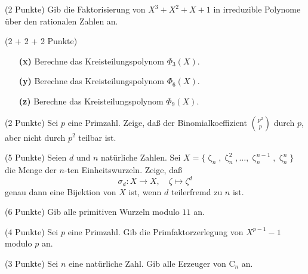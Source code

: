 \documentclass{algsheet}
\begin{document}
\begin{exercise}(2 Punkte)\newline
    Gib die Faktorisierung von \(X^3 + X^2 + X + 1\) in irreduzible Polynome über den rationalen Zahlen an.
\end{exercise}



\begin{exercise}(2 + 2 + 2 Punkte)
        \begin{itemize}
    \item[\textbf{(x)}]    
                   Berechne das Kreisteilungspolynom \(\Phi_3(X)\).
     \item[\textbf{(y)}] 
                  Berechne das Kreisteilungspolynom \(\Phi_6(X)\).
     \item[\textbf{(z)}]
                   Berechne das Kreisteilungspolynom \(\Phi_9(X)\).
        \end{itemize} 
\end{exercise}







\begin{exercise}(2 Punkte)\newline
    Sei \(p\) eine Primzahl. Zeige, daß der Binomialkoeffizient \(\binom{p^2} p\) durch \(p\), aber nicht
    durch \(p^2\) teilbar ist.
\end{exercise}



\begin{exercise}(5 Punkte)\newline
    Seien \(d\) und \(n\) natürliche Zahlen. Sei \(X = \{\upzeta_n, \upzeta_n^2, \dotsc, 
          \upzeta_n^{n - 1},
    \upzeta_n^n\}\) die Menge der \(n\)-ten Einheitswurzeln. Zeige, daß
    \[
        \sigma_d\colon X \to X,\quad \zeta \mapsto \zeta^d
    \]
    genau dann eine Bijektion von \(X\) ist, wenn \(d\) teilerfremd zu \(n\) ist.
\end{exercise}

\begin{exercise}(6 Punkte)\newline
    Gib alle primitiven Wurzeln modulo \(11\) an.
\end{exercise}

\begin{exercise}(4 Punkte)\newline
    Sei \(p\) eine Primzahl. Gib die Primfaktorzerlegung von \(X^{p - 1} - 1\) modulo \(p\) an.
\end{exercise}

\begin{exercise}(3 Punkte)\newline
    Sei \(n\) eine natürliche Zahl. Gib alle Erzeuger von \(\mathrm C_n\) an.
\end{exercise}
\end{document}

